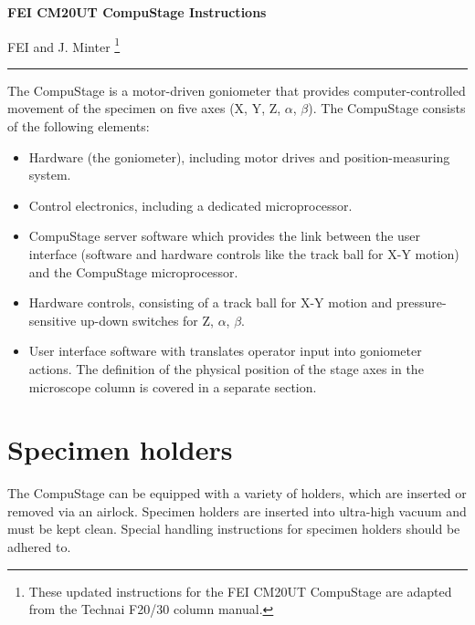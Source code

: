 \documentclass[12pt]{article}
\title{\theTitle}
\author{\theAuthor}
\date{\theDate}
\newcommand{\theAuthor}{FEI and J. Minter}
\newcommand{\theTitle}{FEI CM20UT CompuStage Instructions}
\begin{document}



\begin{center}
\textbf{\LARGE{\theTitle}}
\end{center}

\begin{center}
\theAuthor
\footnote{These updated instructions for the FEI CM20UT CompuStage are
adapted from the Technai F20/30 column manual.}
\end{center}

\vspace{0.125in}
\hrule
\vspace{0.125in}

The CompuStage is a motor-driven goniometer that provides
computer-controlled movement of the specimen on five axes (X, Y, Z,
$\alpha$, $\beta$). The CompuStage consists of the following elements:
\begin{itemize}
\item Hardware (the goniometer), including motor drives and
position-measuring system.
\item Control electronics, including a dedicated microprocessor.
\item CompuStage server software which provides the link between the
user interface (software and hardware controls like the track ball
for X-Y motion) and the CompuStage microprocessor.
\item Hardware controls, consisting of a track ball for X-Y motion and
pressure-sensitive up-down switches for Z, $\alpha$, $\beta$.
\item User interface software with translates operator input into
goniometer actions. The definition of the physical position of the stage
axes in the microscope column is covered in a separate section.
\end{itemize}

\section{Specimen holders}
The CompuStage can be equipped with a variety of holders, which are
inserted or removed via an airlock. Specimen holders are inserted into
ultra-high vacuum and must be kept clean. Special handling
instructions for specimen holders should be adhered to.
\end{document}
